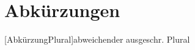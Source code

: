 \section*{Abkürzungen}
\begin{acronym}
	[AbkürzungPlural]{abweichender ausgeschr. Plural}
\end{acronym}